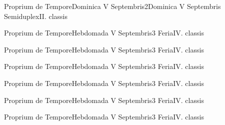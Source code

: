 \documentclass[liber-responsorialis_aestivus.tex]{subfiles}
\begin{document}
	{Proprium de Tempore}{Dominica V Septembris}{2}{Dominica V Septembris}
	{Semiduplex}{II. classis}{}
	{}
	{}

	{Proprium de Tempore}{Hebdomada V Septembris}{3}{}
	{Feria}{IV. classis}{}
	{}
	{}

	{Proprium de Tempore}{Hebdomada V Septembris}{3}{}
	{Feria}{IV. classis}{}
	{}
	{}

	{Proprium de Tempore}{Hebdomada V Septembris}{3}{}
	{Feria}{IV. classis}{}
	{}
	{}

	{Proprium de Tempore}{Hebdomada V Septembris}{3}{}
	{Feria}{IV. classis}{}
	{}
	{}

	{Proprium de Tempore}{Hebdomada V Septembris}{3}{}
	{Feria}{IV. classis}{}
	{}
	{}

	{Proprium de Tempore}{Hebdomada V Septembris}{3}{}
	{Feria}{IV. classis}{}
	{}
	{}
\end{document}
